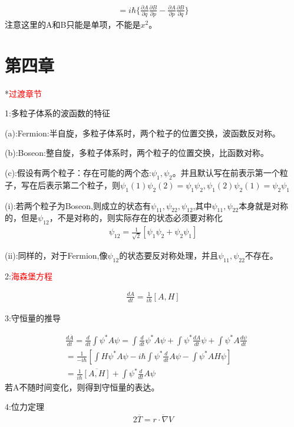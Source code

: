 \documentclass[10pt,journal,compsoc]{IEEEtran}
\begin{document}
\begin{align}
  [A,B]=i\hbar\{\frac{ \partial A}{ \partial q}\frac{ \partial B}{ \partial p}-\frac{ \partial A}{ \partial p}\frac{ \partial B}{ \partial q} \}
\end{align}
注意这里的A和B只能是单项，不能是$x^2$。

\section{第四章}
*\textcolor{red}{过渡章节}

1:多粒子体系的波函数的特征

(a):Fermion:半自旋，多粒子体系时，两个粒子的位置交换，波函数反对称。

(b):Boseon:整自旋，多粒子体系时，两个粒子的位置交换，比函数对称。

(c):假设有两个粒子：存在可能的两个态:$\psi_1,\psi_2$。并且默认写在前表示第一个粒子，写在后表示第二个粒子，则$\psi_1(1)\psi_2(2)=\psi_{1}\psi_2,\psi_1(2)\psi_2(1)=\psi_{2}\psi_1$

(i):若两个粒子为Boseon,则成立的状态有$\psi_{11},\psi_{22},\psi_{12}$,其中$\psi_{11},\psi_{22}$本身就是对称的，但是$\psi_{12}$，不是对称的，则实际存在的状态必须要对称化\begin{align}
  \psi_{12}=\frac1{\sqrt{2}}[\psi_{1}\psi_2+\psi_2\psi_1]
\end{align}

(ii):同样的，对于Fermion,像$\psi_{12}$的状态要反对称处理，并且$\psi_{11},\psi_{22}$不存在。

2:\textcolor{red}{海森堡方程}

\begin{align}
  \frac{dA}{dt}=\frac1{i\hbar}[A,H]
\end{align}

3:守恒量的推导

\begin{align*}
& \frac{d\overline{A}}{dt}=\frac{d}{dt}\int \psi^* A\psi=\int \frac{d}{dt}\psi^* A \psi+\int \psi^* \frac{dA}{dt}\psi+\int \psi^* A \frac{d\psi}{dt}\\
& = \frac1{-i\hbar}[\int H\psi^* A\psi-i\hbar\int\psi^*\frac{d}{dt} A\psi-\int \psi^* A H\psi ]\\
&=\frac1{i\hbar}\overline{[A,H]}+ \int{\psi^*\frac{d}{dt} A\psi}
\end{align*}
若A不随时间变化，则得到守恒量的表达。

4:位力定理\begin{align}
  2\overline{T}=\overline{r\cdot\nabla V}
\end{align}
\end{document}
